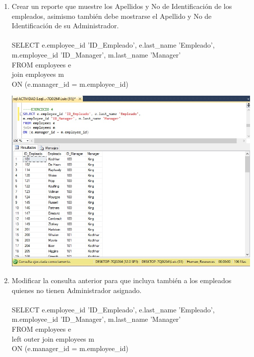 \begin{enumerate}[1.]
	\item Crear un reporte que muestre los Apellidos y No de Identificación de los empleados, asimismo también debe mostrarse el Apellido y No de Identificaci\'on de su Administrador.
	\\
	\\SELECT e.employee\_id 'ID\_Empleado', e.last\_name 'Empleado', 
	\\m.employee\_id 'ID\_Manager', m.last\_name 'Manager' 
	\\FROM employees e 
	\\join employees m 
	\\ON (e.manager\_id = m.employee\_id)


	\begin{center}
	\includegraphics[width=17cm]{./Imagenes/8ejer4} 
	\end{center}

	\item Modificar la consulta anterior para que incluya tambi\'en a los empleados quienes no tienen Administrador asignado.
	\\
	\\SELECT e.employee\_id 'ID\_Empleado', e.last\_name 'Empleado', 
	\\m.employee\_id 'ID\_Manager', m.last\_name 'Manager' 
	\\FROM employees e 
	\\left outer join employees m
	\\ON (e.manager\_id = m.employee\_id)


\end{enumerate}
